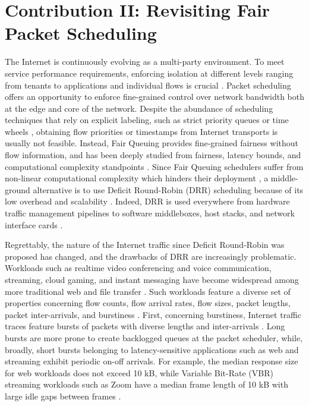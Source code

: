 \section{Contribution II: Revisiting Fair Packet Scheduling}

The Internet is continuously evolving as a multi-party environment. To meet service performance requirements, enforcing isolation at different levels ranging from tenants to applications and individual flows is crucial \cite{sharing,loom,carousel,fairnic,mrfq,heracles}. 
Packet scheduling offers an opportunity to enforce fine-grained
control over network bandwidth both at the edge and core of the
network. Despite the abundance of scheduling techniques that rely on explicit labeling, such as strict priority queues \cite{aifo,karuna,afq} or time wheels \cite{carousel,calendar}, obtaining flow priorities or timestamps from
Internet transports is usually not feasible.
Instead, Fair Queuing provides fine-grained fairness without flow information, and has been deeply studied from fairness, latency bounds, and computational complexity standpoints
\cite{gps,wfq,nagle,scfq,stfq,wf2q}. Since Fair Queuing schedulers suffer from non-linear computational complexity which hinders their deployment \cite{stfq,scfq,wf2q}, a middle-ground alternative is to
use Deficit Round-Robin (DRR) scheduling 
because of its low overhead and scalability \cite{drr,aliquem,strr,frr}. Indeed, DRR is used everywhere from hardware traffic
management pipelines to software middleboxes, host stacks, and network interface cards 
\cite{loom,cisco,juniper,tc,pifo,intel710,intel810}.

Regrettably, the nature of the Internet traffic since Deficit Round-Robin was proposed has changed, and the drawbacks of DRR are increasingly problematic.
Workloads such as realtime video conferencing and voice communication, streaming, cloud gaming, and instant messaging have become widespread among more traditional web and file transfer \cite{rtc,pandemic,video,zoom,confucius,gaming,enterprise,baidu,canyousee}. Such workloads feature a diverse set of properties concerning flow counts, flow arrival rates, flow sizes, packet lengths, packet inter-arrivals, and burstiness \cite{cachelib,enterprise,milisampler,baidu,wild,autosens,canyousee}.
First, concerning burstiness, Internet traffic traces feature bursts of packets with diverse lengths and inter-arrivals \cite{caida, mawi,ccdc,wild,im}. Long bursts are more prone to create backlogged queues at the packet scheduler, while, broadly, short bursts belonging to latency-sensitive applications such as web and streaming  \cite{edge,passive} exhibit periodic on-off arrivals. For example, the
median response size for web workloads does not exceed 10 kB, while
Variable Bit-Rate (VBR) streaming workloads such as Zoom have
a median frame length of 10 kB with large idle gaps between frames
\cite{passive}.

